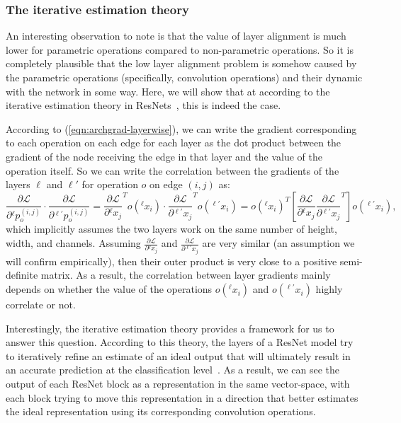 \documentclass{article} \usepackage{fancyhdr, iclr2023_conference, times}
\newcommand{\lambdafn}{layer alignment\xspace}
\begin{document}
\subsubsection{The iterative estimation theory}
\par An interesting observation to note is that the value of \lambdafn is much lower for parametric operations compared to non-parametric operations. So it is completely plausible that the low \lambdafn problem is somehow caused by the parametric operations (specifically, convolution operations) and their dynamic with the network in some way. Here, we will show that at according to the iterative estimation theory in ResNets~\citep{DBLP:conf/iclr/GreffSS17}, this is indeed the case.
\par According to (\ref{eqn:archgrad-layerwise}), we can write the gradient corresponding to each operation on each edge for each layer as the dot product between the gradient of the node receiving the edge in that layer and the value of the operation itself. So we can write the correlation between the gradients of the layers $\ell$ and $\ell'$ for operation $o$ on edge $(i, j)$ as:
\begin{equation}
    \frac{\partial \mathcal{L}}{\partial {}^\ell p_{o}^{(i, j)}}\cdot \frac{\partial \mathcal{L}}{\partial {}^{\ell'} p_{o}^{(i, j)}}=\frac{\partial \mathcal{L}}{\partial {}^\ell x_j}^To({}^\ell x_i)\cdot \frac{\partial \mathcal{L}}{\partial {}^{\ell'} x_j}^To({}^{\ell'} x_i)=o({}^\ell x_i)^T\left[\frac{\partial \mathcal{L}}{\partial {}^\ell x_j} \frac{\partial \mathcal{L}}{\partial {}^{\ell'} x_j}^T\right]o({}^{\ell'} x_i)\text{,}
\end{equation}
which implicitly assumes the two layers work on the same number of height, width, and channels. Assuming $\frac{\partial \mathcal{L}}{\partial {}^\ell x_j}$ and $\frac{\partial \mathcal{L}}{\partial {}^{\ell'} x_j}$ are very similar (an assumption we will confirm empirically), then their outer product is very close to a positive semi-definite matrix. As a result, the correlation between layer gradients mainly depends on whether the value of the operations $o({}^\ell x_i)$ and $o({}^{\ell'} x_i)$ highly correlate or not. 
\par Interestingly, the iterative estimation theory provides a framework for us to answer this question. According to this theory, the layers of a ResNet model try to iteratively refine an estimate of an ideal output that will ultimately result in an accurate prediction at the classification level~\citep{DBLP:conf/iclr/GreffSS17, DBLP:conf/iclr/JastrzebskiABVC18}. As a result, we can see the output of each ResNet block as a representation in the same vector-space, with each block trying to move this representation in a direction that better estimates the ideal representation using its corresponding convolution operations.
\end{document}
